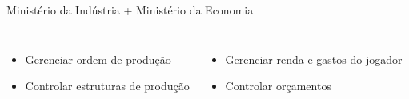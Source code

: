 \documentclass{beamer}
\begin{document}
\begin{frame}{Ministério da Indústria + Ministério da Economia}
\begin{columns}
  \footnotesize{
  \begin{itemize}
    \item Gerenciar ordem de produção
    \item Controlar estruturas de produção
  \end{itemize}
  }

  \footnotesize{
  \begin{itemize}
    \item Gerenciar renda e gastos do jogador
    \item Controlar orçamentos
  \end{itemize}
  }
\end{columns}
\end{frame}
\end{document}
